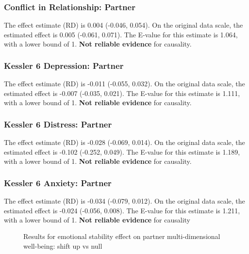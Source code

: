 \documentclass[
  singlecolumn]{article}
\begin{document}
\subsubsection{Conflict in Relationship:
Partner}\label{conflict-in-relationship-partner-3}

The effect estimate (RD) is 0.004 (-0.046, 0.054). On the original data
scale, the estimated effect is 0.005 (-0.061, 0.071). The E-value for
this estimate is 1.064, with a lower bound of 1. \textbf{Not reliable
evidence} for causality.

\subsubsection{Kessler 6 Depression:
Partner}\label{kessler-6-depression-partner-3}

The effect estimate (RD) is -0.011 (-0.055, 0.032). On the original data
scale, the estimated effect is -0.007 (-0.035, 0.021). The E-value for
this estimate is 1.111, with a lower bound of 1. \textbf{Not reliable
evidence} for causality.

\subsubsection{Kessler 6 Distress:
Partner}\label{kessler-6-distress-partner-3}

The effect estimate (RD) is -0.028 (-0.069, 0.014). On the original data
scale, the estimated effect is -0.102 (-0.252, 0.049). The E-value for
this estimate is 1.189, with a lower bound of 1. \textbf{Not reliable
evidence} for causality.

\subsubsection{Kessler 6 Anxiety:
Partner}\label{kessler-6-anxiety-partner-3}

The effect estimate (RD) is -0.034 (-0.079, 0.012). On the original data
scale, the estimated effect is -0.024 (-0.056, 0.008). The E-value for
this estimate is 1.211, with a lower bound of 1. \textbf{Not reliable
evidence} for causality

\begin{figure}


\caption{\label{fig-results-emotional-stability-partner-up}Results for
emotional stability effect on partner multi-dimensional well-being:
shift up vs null}

\end{figure}%
\end{document}
